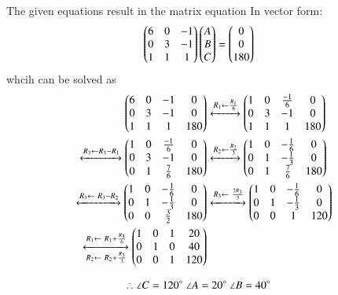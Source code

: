 
The given equations result in the matrix equation
In vector form:
\begin{align}
\begin{pmatrix}6 & 0 & -1 \\
0 & 3 & -1 \\
1 & 1 & 1 
\end{pmatrix}\begin{pmatrix}A \\ B \\ C\end{pmatrix} &= \begin{pmatrix}0\\0\\180\end{pmatrix}
\end{align}
whcih can be solved as
\begin{align}
\myvec{6 & 0 & -1 & 0 \\
0 & 3 & -1 & 0 \\
1 & 1 & 1 & 180
}
&\xleftrightarrow[]{R_1 \leftarrow \frac{R_1}{6}}
\myvec{1 & 0 & \frac{-1}{6} & 0 \\
0 & 3 & -1 & 0 \\
1 & 1 & 1 & 180
}\\
\xleftrightarrow[]{R_3 \leftarrow R_3 - R_1}
\myvec{1 & 0 & \frac{-1}{6} & 0\\
0 & 3 & -1 & 0 \\
0 & 1 & \frac{7}{6} & 180}
&\xleftrightarrow[]{R_2 \leftarrow \frac{R_2}{3}}
\myvec{1 & 0 & -\frac{1}{6} & 0 \\
0 & 1 & -\frac{1}{3} & 0 \\
0 & 1 & \frac{7}{6} & 180
}\\
\xleftrightarrow[]{R_3 \leftarrow \ R_3-R_2}
\myvec{1 & 0 & -\frac{1}{6} &  0 \\
0 & 1 & -\frac{1}{3} & 0 \\ 
0 & 0 & \frac{3}{2} & 180
}
&\xleftrightarrow[]{R_3 \leftarrow \ \frac{2R_3}{3}}
\myvec{1 & 0 & -\frac{1}{6} &  0 \\
0 & 1 & -\frac{1}{3} & 0 \\ 
0 & 0 & 1 & 120
}\\ 
\xleftrightarrow[R_2 \leftarrow \ R_2+ \frac{R_3}{3}]{R_1 \leftarrow \ R_1 + \frac{R_3}{6}}
\myvec{1 & 0 & 1 &  20 \\
0 & 1 & 0 & 40 \\ 
0 & 0 & 1 & 120
}& 
\end{align}

\begin{align}
\therefore \angle C = 120\degree \ \angle A = 20\degree \ \angle B &= 40\degree 
\end{align}

%
%
%
%
